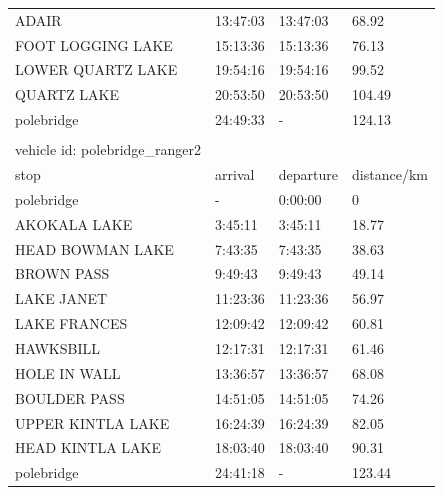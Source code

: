 \documentclass[12pt]{article}
\begin{document}
\begin{appendices}
\begin{table}[ht!]
\begin{tabular}{@{}llll@{}}
ADAIR                            & 13:47:03 & 13:47:03  & 68.92       \\
FOOT LOGGING LAKE                & 15:13:36 & 15:13:36  & 76.13       \\
LOWER QUARTZ LAKE                & 19:54:16 & 19:54:16  & 99.52       \\
QUARTZ LAKE                      & 20:53:50 & 20:53:50  & 104.49      \\
polebridge                       & 24:49:33  & -         & 124.13      \\ \bottomrule
                                 &          &           &             \\ \toprule
vehicle id: polebridge\_ranger2  &          &           &             \\ \midrule
stop                             & arrival  & departure & distance/km \\
polebridge                       & -        & 0:00:00   & 0           \\
AKOKALA LAKE                     & 3:45:11  & 3:45:11   & 18.77       \\
HEAD BOWMAN LAKE                 & 7:43:35  & 7:43:35   & 38.63       \\
BROWN PASS                       & 9:49:43  & 9:49:43   & 49.14       \\
LAKE JANET                       & 11:23:36 & 11:23:36  & 56.97       \\
LAKE FRANCES                     & 12:09:42 & 12:09:42  & 60.81       \\
HAWKSBILL                        & 12:17:31 & 12:17:31  & 61.46       \\
HOLE IN WALL                     & 13:36:57 & 13:36:57  & 68.08       \\
BOULDER PASS                     & 14:51:05 & 14:51:05  & 74.26       \\
UPPER KINTLA LAKE                & 16:24:39 & 16:24:39  & 82.05       \\
HEAD KINTLA LAKE                 & 18:03:40 & 18:03:40  & 90.31       \\
polebridge                       & 24:41:18  & -         & 123.44      \\ \bottomrule
\end{tabular}
\end{table}


\end{appendices}
\end{document}
